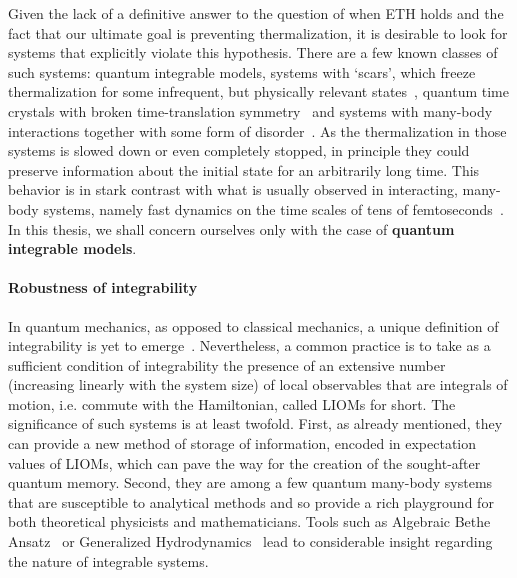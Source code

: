 Given the lack of a definitive answer to the question of when ETH holds and the fact that our ultimate goal is preventing thermalization, it is desirable to look for systems
that explicitly violate this hypothesis. There are a few known classes of such systems:
quantum integrable models, systems with `scars', which freeze thermalization for
some infrequent, but physically relevant states~\autocite{Turner2018a, Turner2018}, quantum time crystals with
broken time-translation symmetry~\autocite{Wilczek2012, Sacha2017} and systems with many-body interactions together
with some form of disorder~\autocite{Basko2006}. As the thermalization in those systems is slowed down or even
completely stopped, in principle they could preserve information about the initial state for an arbitrarily long time.
This behavior is in stark contrast with what is usually observed in interacting, many-body systems, namely fast
dynamics on the time scales of tens of femtoseconds~\autocite{DalConte2015}.
In this thesis, we shall concern ourselves only with the case of \textbf{quantum integrable models}.

\paragraph{Robustness of integrability}
In quantum mechanics, as opposed to classical mechanics, a unique definition of integrability
is yet to emerge~\autocite{Caux2011, Yuzbashyan2013}. Nevertheless, a common practice is to take as a sufficient condition of
integrability the presence of an extensive number (increasing linearly with the system size) of local observables
that are integrals of motion, i.e. commute with the Hamiltonian, called LIOMs for short. The significance of such
systems is at least twofold.
First, as already mentioned, they can provide a new method of storage of information, encoded in expectation values
of LIOMs, which can pave the way for the creation of the sought-after quantum memory.
Second, they are among a few quantum many-body systems that are susceptible to analytical methods and so provide
a rich playground for both theoretical physicists and mathematicians. Tools such as Algebraic Bethe
Ansatz~\autocite{Faddeev1995,Faddeev1996,Korepin1993} or Generalized Hydrodynamics~\autocite{Agrawal2020,Friedman2020,
    Bertini2021, Bastianello2021, Bulchandani2021} lead to considerable insight regarding the nature of integrable systems.

